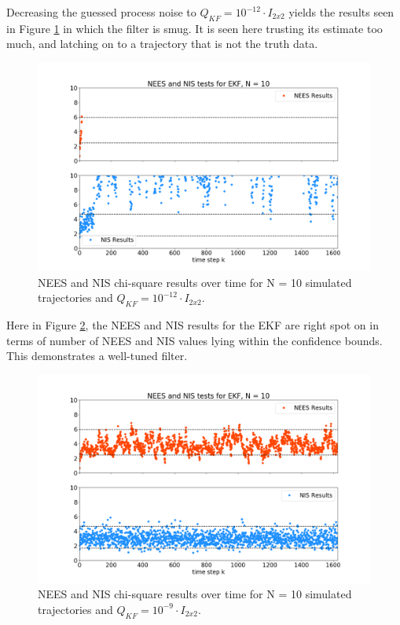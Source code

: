\documentclass[11pt, a4paper]{article}
\begin{document}
Decreasing the guessed process noise to $Q_{KF}= 10^{-12} \cdot I_{2 x 2}$ yields the results seen in Figure \ref{fig:neesnis_ekf_Qsmall} in which the filter is smug. 
It is seen here trusting its estimate too much, and latching on to a trajectory that is not the truth data. 
\begin{figure}[H]
	\centering
	\includegraphics[width=\textwidth]{./Figures/NEESNIS_ekf_N10Q1.0E-12.png}
	\caption{NEES and NIS chi-square results over time for N = 10 simulated trajectories and $Q_{KF} = 10^{-12} \cdot I_{2 x 2}$.}
	\label{fig:neesnis_ekf_Qsmall}
\end{figure}

Here in Figure \ref{fig:neesnis_ekf}, the NEES and NIS results for the EKF are right spot on in terms of number of NEES and NIS values lying within the confidence bounds. 
This demonstrates a well-tuned filter. 
\begin{figure}[H]
	\centering
	\includegraphics[width=\textwidth]{./Figures/NEESNIS_ekf_N10Q1.0E-09.png}
	\caption{NEES and NIS chi-square results over time for N = 10 simulated trajectories and $Q_{KF} = 10^{-9} \cdot I_{2 x 2}$.}
	\label{fig:neesnis_ekf}
\end{figure}
\end{document}

